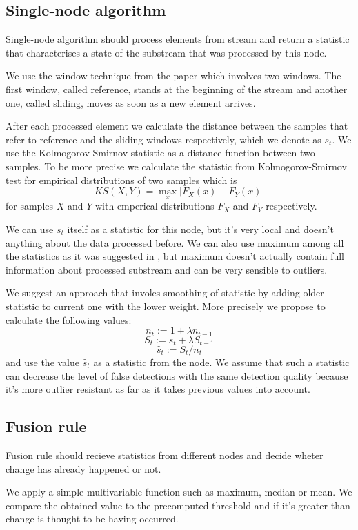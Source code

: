 \subsection{Single-node algorithm}

Single-node algorithm should process elements from stream and return a statistic that characterises a state of the substream that was processed by this node.

We use the window technique from the paper \cite{kifer2004detecting} which involves two windows. The first window, called reference, stands at the beginning of the stream and another one, called sliding, moves as soon as a new element arrives.

After each processed element we calculate the distance between the samples that refer to reference and the sliding windows respectively, which we denote as $s_t$. We use the Kolmogorov-Smirnov statistic as a distance function between two samples. To be more precise we calculate the statistic from Kolmogorov-Smirnov test for empirical distributions of two samples which is $$KS(X, Y) = \max_x \left|F_X(x) - F_Y(x)\right|$$ for samples $X$ and $Y$ with emperical distributions $F_X$ and $F_Y$ respectively.

We can use $s_t$ itself as a statistic for this node, but it's very local and doesn't anything about the data processed before. We can also use maximum among all the statistics as it was suggested in \cite{kifer2004detecting}, but maximum doesn't actually contain full information about processed substream and can be very sensible to outliers.

We suggest an approach that involes smoothing of statistic by adding older statistic to current one with the lower weight. More precisely we propose to calculate the following values: $$n_t := 1 + \lambda n_{t - 1} $$ $$S_t := s_t + \lambda S_{t - 1}$$ $$\hat{s}_t := S_t / n_t$$ and use the value $\hat{s}_t$ as a statistic from the node. We assume that such a statistic can decrease the level of false detections with the same detection quality because it's more outlier resistant as far as it takes previous values into account.


\subsection{Fusion rule}

Fusion rule should recieve statistics from different nodes and decide wheter change has already happened or not.

We apply a simple multivariable function such as maximum, median or mean. We compare the obtained value to the precomputed threshold and if it's greater than change is thought to be having occurred.